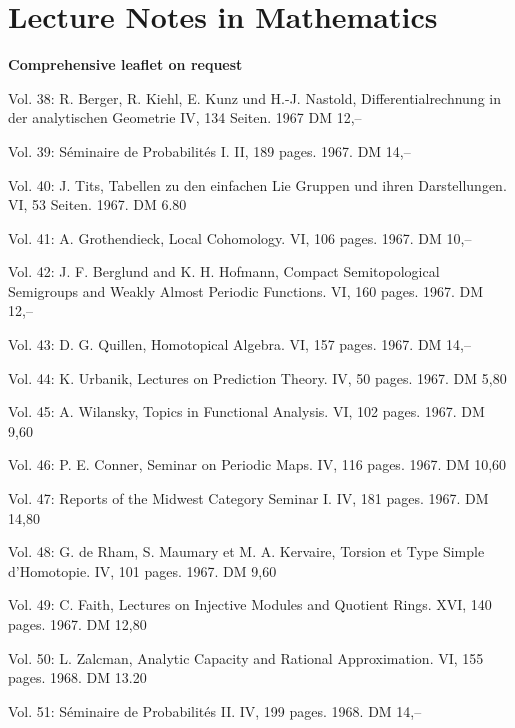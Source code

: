 %

%

%
\section*{Lecture Notes in Mathematics}
\textbf{Comprehensive leaflet on request}

Vol. 38: R. Berger, R. Kiehl, E. Kunz und H.-J. Nastold, Differentialrechnung in der analytischen Geometrie IV, 134 Seiten. 1967 DM 12,--

Vol. 39: Séminaire de Probabilités I. II, 189 pages. 1967. DM 14,--

Vol. 40: J. Tits, Tabellen zu den einfachen Lie Gruppen und ihren Darstellungen. VI, 53 Seiten. 1967. DM 6.80

Vol. 41: A. Grothendieck, Local Cohomology. VI, 106 pages. 1967. DM 10,--

Vol. 42: J. F. Berglund and K. H. Hofmann, Compact Semitopological Semigroups and Weakly Almost Periodic Functions. VI, 160 pages. 1967. DM 12,--

Vol. 43: D. G. Quillen, Homotopical Algebra. VI, 157 pages. 1967. DM 14,--

Vol. 44: K. Urbanik, Lectures on Prediction Theory. IV, 50 pages. 1967. DM 5,80

Vol. 45: A. Wilansky, Topics in Functional Analysis. VI, 102 pages. 1967. DM 9,60

Vol. 46: P. E. Conner, Seminar on Periodic Maps. IV, 116 pages. 1967. DM 10,60

Vol. 47: Reports of the Midwest Category Seminar I. IV, 181 pages. 1967. DM 14,80

Vol. 48: G. de Rham, S. Maumary et M. A. Kervaire, Torsion et Type Simple d'Homotopie. IV, 101 pages. 1967. DM 9,60

Vol. 49: C. Faith, Lectures on Injective Modules and Quotient Rings. XVI, 140 pages. 1967. DM 12,80

Vol. 50: L. Zalcman, Analytic Capacity and Rational Approximation. VI, 155 pages. 1968. DM 13.20

Vol. 51: Séminaire de Probabilités II. IV, 199 pages. 1968. DM 14,--

